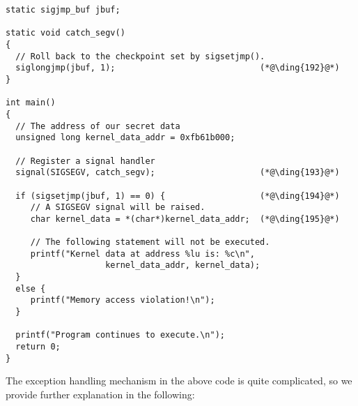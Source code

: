 \begin{lstlisting}[caption=\texttt{ExceptionHandling.c}]
static sigjmp_buf jbuf;

static void catch_segv()
{
  // Roll back to the checkpoint set by sigsetjmp().
  siglongjmp(jbuf, 1);                             (*@\ding{192}@*)
}

int main()
{ 
  // The address of our secret data
  unsigned long kernel_data_addr = 0xfb61b000;

  // Register a signal handler
  signal(SIGSEGV, catch_segv);                     (*@\ding{193}@*)

  if (sigsetjmp(jbuf, 1) == 0) {                   (*@\ding{194}@*)
     // A SIGSEGV signal will be raised. 
     char kernel_data = *(char*)kernel_data_addr;  (*@\ding{195}@*)

     // The following statement will not be executed.
     printf("Kernel data at address %lu is: %c\n", 
                    kernel_data_addr, kernel_data);
  }
  else {
     printf("Memory access violation!\n");
  }

  printf("Program continues to execute.\n");
  return 0;
}
\end{lstlisting}



The exception handling mechanism in the above code is quite complicated, so we provide further
explanation in the following:

